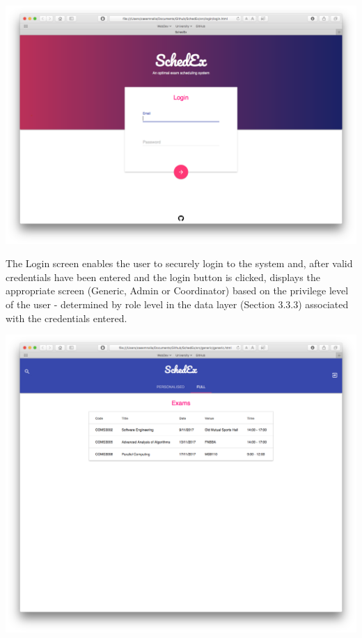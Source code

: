 \documentclass{article}
\begin{document}
\centerline{\includegraphics[scale=0.4]{login}} 


The Login screen enables the user to securely login to the system and, after valid credentials have been entered and the login button is clicked,  displays the appropriate screen (Generic, Admin or Coordinator) based on the privilege level of the user - determined by role level in the data layer (Section 3.3.3) associated with the credentials entered.   

\centerline{\includegraphics[scale=0.4]{generic_full}}
\end{document}
